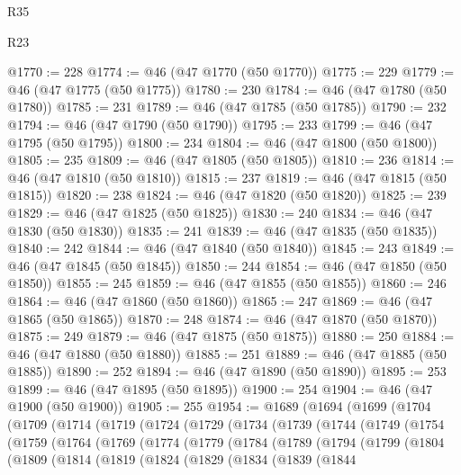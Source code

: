\begin{lexlean}{R35}
\begin{lexlean}{R23}
\begin{coremodule}
{{{{{{{{{{{{{{{{{{{{{@1770 := 228
@1774 := @46 (@47 @1770 (@50 @1770))
@1775 := 229
@1779 := @46 (@47 @1775 (@50 @1775))
@1780 := 230
@1784 := @46 (@47 @1780 (@50 @1780))
@1785 := 231
@1789 := @46 (@47 @1785 (@50 @1785))
@1790 := 232
@1794 := @46 (@47 @1790 (@50 @1790))
@1795 := 233
@1799 := @46 (@47 @1795 (@50 @1795))
@1800 := 234
@1804 := @46 (@47 @1800 (@50 @1800))
@1805 := 235
@1809 := @46 (@47 @1805 (@50 @1805))
@1810 := 236
@1814 := @46 (@47 @1810 (@50 @1810))
@1815 := 237
@1819 := @46 (@47 @1815 (@50 @1815))
@1820 := 238
@1824 := @46 (@47 @1820 (@50 @1820))
@1825 := 239
@1829 := @46 (@47 @1825 (@50 @1825))
@1830 := 240
@1834 := @46 (@47 @1830 (@50 @1830))
@1835 := 241
@1839 := @46 (@47 @1835 (@50 @1835))
@1840 := 242
@1844 := @46 (@47 @1840 (@50 @1840))
@1845 := 243
@1849 := @46 (@47 @1845 (@50 @1845))
@1850 := 244
@1854 := @46 (@47 @1850 (@50 @1850))
@1855 := 245
@1859 := @46 (@47 @1855 (@50 @1855))
@1860 := 246
@1864 := @46 (@47 @1860 (@50 @1860))
@1865 := 247
@1869 := @46 (@47 @1865 (@50 @1865))
@1870 := 248
@1874 := @46 (@47 @1870 (@50 @1870))
@1875 := 249
@1879 := @46 (@47 @1875 (@50 @1875))
@1880 := 250
@1884 := @46 (@47 @1880 (@50 @1880))
@1885 := 251
@1889 := @46 (@47 @1885 (@50 @1885))
@1890 := 252
@1894 := @46 (@47 @1890 (@50 @1890))
@1895 := 253
@1899 := @46 (@47 @1895 (@50 @1895))
@1900 := 254
@1904 := @46 (@47 @1900 (@50 @1900))
@1905 := 255
@1954 := @1689
    (@1694
      (@1699
        (@1704
          (@1709
            (@1714
              (@1719
                (@1724
                  (@1729
                    (@1734
                      (@1739
                        (@1744
                          (@1749
                            (@1754
                              (@1759
                                (@1764
                                  (@1769
                                    (@1774
                                      (@1779
                                        (@1784
                                          (@1789
                                            (@1794
                                              (@1799
                                                (@1804
                                                  (@1809
                                                    (@1814
                                                      (@1819
                                                        (@1824
                                                          (@1829
                                                            (@1834
                                                              (@1839
                                                                (@1844
}}}}}}}}}}}}}}}}}}}}}
\end{coremodule}
\end{lexlean}
\end{lexlean}
